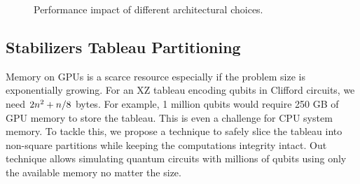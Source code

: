 \documentclass[runningheads]{llncs}
\begin{document}
\begin{figure}[!t]
	\centering
	 {
		\captionsetup[subfloat]{labelfont=large,textfont=large}
		\quad
	}
	\caption{Performance impact of different architectural choices.}
	\label{fig:configs}
\end{figure}

\subsection{Stabilizers Tableau Partitioning}
 
Memory on GPUs is a scarce resource especially if the problem size is exponentially growing. For an XZ tableau encoding \numQubits qubits in Clifford circuits, we need $2n^{2} + n/ 8 $ bytes. For example, 1 million qubits would require 250 GB of GPU memory to store the tableau. This is even a challenge for CPU system memory. To tackle this, we propose a technique to safely slice the tableau into non-square partitions while keeping the computations integrity intact. Out technique allows simulating quantum circuits with millions of qubits using only the available memory no matter the size. 
\end{document}
